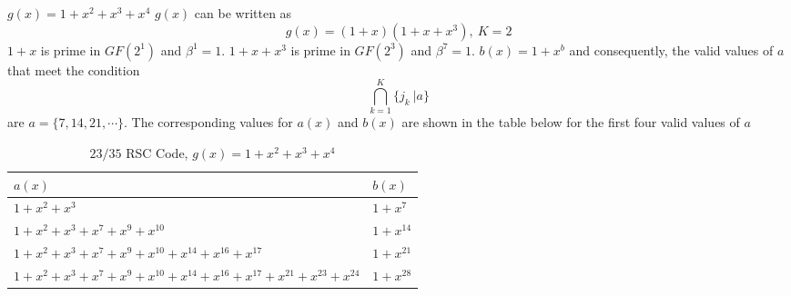 \begin{example}
$g(x)=1+x^2+x^3+x^4$\newline
$g(x)$ can be written as $$g(x)=(1+x)(1+x+x^3),~K=2$$
 $1+x$ is prime in $GF(2^1)$ and $\beta^{1}=1$. $1+x+x^3$ is prime in $GF(2^3)$ and $\beta^{7}=1$. $b(x)=1+x^b$ and consequently, the valid values of $a$ that meet the condition $$ \bigcap_{k=1}^{K} \{j_k~| a\}$$ are $a=\{7,14,21,\cdots \}$.
The corresponding values for $a(x)$ and $b(x)$ are shown in the table below for the first four valid values of $a$

\begin{table*}[h]
\caption{$23/35$ RSC Code, $g(x)=1+x^2+x^3+x^4$}
\centering
 \begin{tabular}{p{6cm}| p{8cm}} 
 \hline
 $a(x)$ & $b(x)$  \\ [0.5ex] 
 \hline\hline
$1+x^2+x^3$ & $1+x^7$ \\ 
\hline
$1+x^2+x^3+x^7+x^9+x^{10}$ &  $1+x^{14}$ \\
\hline
$1+x^2+x^3+x^7+x^{9}+x^{10}+x^{14}+x^{16}+x^{17}$ & $1+x^{21}$ 
\\
\hline
$1+x^2+x^3+x^7+x^{9}+x^{10}+x^{14}+x^{16}+x^{17}+x^{21}+x^{23}+x^{24}$ & $1+x^{28}$
 \end{tabular}
 \label{novelTab6}
\end{table*}
\end{example}

\newpage



